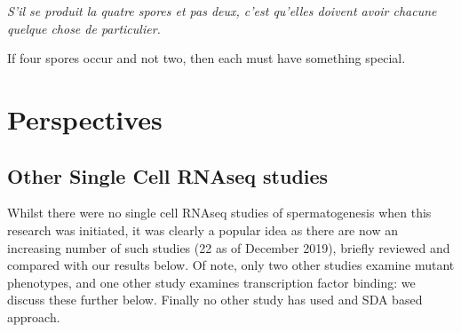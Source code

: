 \begin{savequote}[8cm]
\textit{S'il se produit la quatre spores et pas deux, c'est qu'elles doivent avoir chacune quelque chose de particulier.}

If four spores occur and not two, then each must have something special.
\end{savequote}

\chapter{\label{ch:4-discuss}Perspectives}

\minitoc


\section{Other Single Cell RNAseq studies}
Whilst there were no single cell RNAseq studies of spermatogenesis when this research was initiated, it was clearly a popular idea as there are now an increasing number of such studies (22 as of December 2019), briefly reviewed and compared with our results below. Of note, only two other studies examine mutant phenotypes, and one other study examines transcription factor binding: we discuss these further below. Finally no other study has used and SDA based approach.



